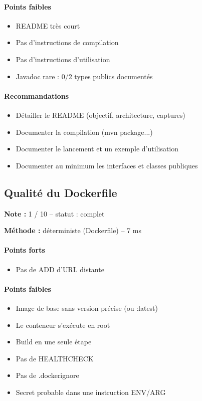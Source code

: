 \documentclass[11pt,a4paper]{article}
\begin{document}
\paragraph{Points faibles}
\begin{itemize}
  \item README très court
  \item Pas d'instructions de compilation
  \item Pas d'instructions d'utilisation
  \item Javadoc rare : 0/\allowbreak{}2 types publics documentés
\end{itemize}
\paragraph{Recommandations}
\begin{itemize}
  \item Détailler le README (objectif, architecture, captures)
  \item Documenter la compilation (mvn package...)
  \item Documenter le lancement et un exemple d'utilisation
  \item Documenter au minimum les interfaces et classes publiques
\end{itemize}
\subsection{Qualité du Dockerfile}
\noindent\textbf{Note :} 1 /\allowbreak{} 10 -- statut : complet

\noindent\textbf{Méthode :} déterministe (Dockerfile) -- 7 ms

\paragraph{Points forts}
\begin{itemize}
  \item Pas de ADD d'URL distante
\end{itemize}
\paragraph{Points faibles}
\begin{itemize}
  \item Image de base sans version précise (ou :latest)
  \item Le conteneur s'exécute en root
  \item Build en une seule étape
  \item Pas de HEALTHCHECK
  \item Pas de .dockerignore
  \item Secret probable dans une instruction ENV/\allowbreak{}ARG
\end{itemize}
\end{document}

